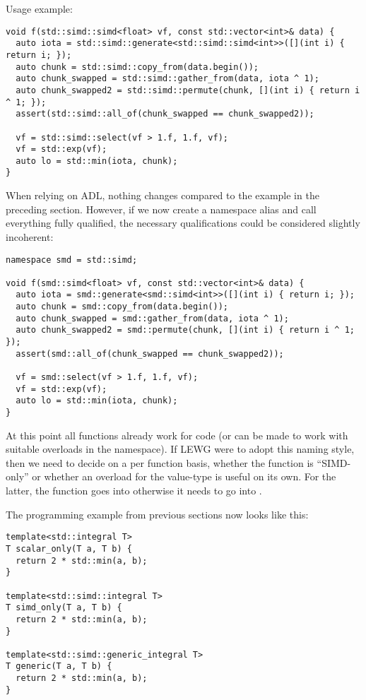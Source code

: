 Usage example:
\medskip\begin{lstlisting}[style=Vc]
void f(std::simd::simd<float> vf, const std::vector<int>& data) {
  auto iota = std::simd::generate<std::simd::simd<int>>([](int i) { return i; });
  auto chunk = std::simd::copy_from(data.begin());
  auto chunk_swapped = std::simd::gather_from(data, iota ^ 1);
  auto chunk_swapped2 = std::simd::permute(chunk, [](int i) { return i ^ 1; });
  assert(std::simd::all_of(chunk_swapped == chunk_swapped2));

  vf = std::simd::select(vf > 1.f, 1.f, vf);
  vf = std::exp(vf);
  auto lo = std::min(iota, chunk);
}
\end{lstlisting}

When relying on ADL, nothing changes compared to the example in the preceding
section.
However, if we now create a namespace alias and call everything fully
qualified, the necessary qualifications could be considered slightly
incoherent:

\medskip\begin{lstlisting}[style=Vc]
namespace smd = std::simd;

void f(smd::simd<float> vf, const std::vector<int>& data) {
  auto iota = smd::generate<smd::simd<int>>([](int i) { return i; });
  auto chunk = smd::copy_from(data.begin());
  auto chunk_swapped = smd::gather_from(data, iota ^ 1);
  auto chunk_swapped2 = smd::permute(chunk, [](int i) { return i ^ 1; });
  assert(smd::all_of(chunk_swapped == chunk_swapped2));

  vf = smd::select(vf > 1.f, 1.f, vf);
  vf = std::exp(vf);
  auto lo = std::min(iota, chunk);
}
\end{lstlisting}

At this point all functions already work for \simdgeneric code (or can be made
to work with suitable overloads in the \std{} namespace).
If LEWG were to adopt this naming style, then we need to decide on a per
function basis, whether the function is “SIMD-only” or whether an overload for
the value-type is useful on its own.
For the latter, the function goes into  otherwise it needs to go
into \std{}.

The \simdgeneric programming example from previous sections now looks like
this:
\medskip\begin{lstlisting}[style=Vc]
template<std::integral T>
T scalar_only(T a, T b) {
  return 2 * std::min(a, b);
}

template<std::simd::integral T>
T simd_only(T a, T b) {
  return 2 * std::min(a, b);
}

template<std::simd::generic_integral T>
T generic(T a, T b) {
  return 2 * std::min(a, b);
}
\end{lstlisting}

